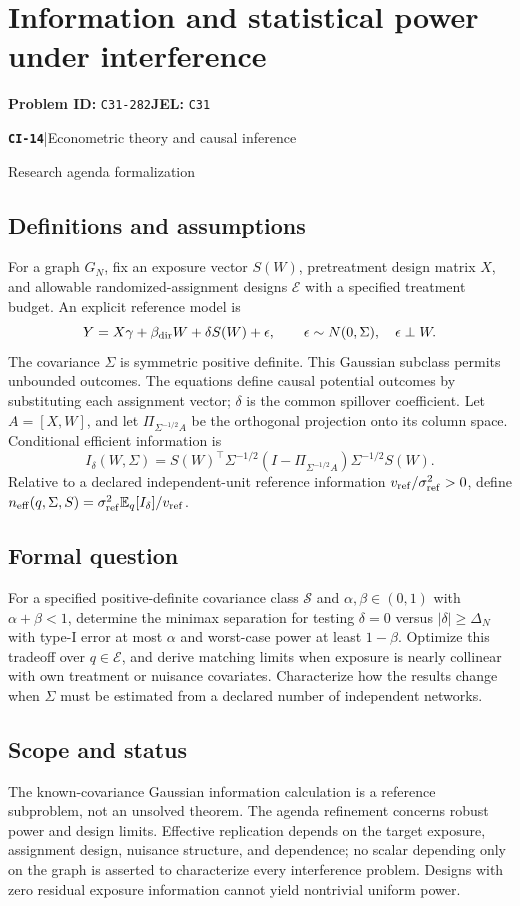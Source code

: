 \documentclass[11pt,a4paper]{article}
\newcommand{\E}{\mathbb E}
\newcommand{\entrymeta}[3]{{\sffamily\small\color{muted}\textbf{\texttt{#1}}\quad|\quad #2\par #3\par}}
\begin{document}
\section*{Information and statistical power under interference}
\textbf{Problem ID:} \texttt{C31-282}\quad \textbf{JEL:} \texttt{C31}\par
\label{problem:OP-0493}
\label{beyond:CI-14}
\entrymeta{CI-14}{Econometric theory and causal inference}{Research agenda formalization}
\subsection*{Definitions and assumptions}
For a graph $G_N$, fix an exposure vector $S(W)$, pretreatment design matrix $X$, and allowable randomized-assignment designs $\mathcal E$ with a specified treatment budget. An explicit reference model is
\[
Y=X\gamma+\beta_{\rm dir}W+\delta S(W)+\epsilon,\qquad
\epsilon\sim N(0,\Sigma),\quad \epsilon\perp W.
\]
The covariance $\Sigma$ is symmetric positive definite. This Gaussian subclass permits unbounded outcomes. The equations define causal potential outcomes by substituting each assignment vector; $\delta$ is the common spillover coefficient. Let $A=[X,W]$, and let $\Pi_{\Sigma^{-1/2}A}$ be the orthogonal projection onto its column space. Conditional efficient information is
\[
I_\delta(W,\Sigma)=
S(W)^\top\Sigma^{-1/2}
(I-\Pi_{\Sigma^{-1/2}A})\Sigma^{-1/2}S(W).
\]
Relative to a declared independent-unit reference information $v_{\rm ref}/\sigma_{\rm ref}^2>0$, define
$n_{\rm eff}(q,\Sigma,S)=\sigma_{\rm ref}^2\E_q[I_\delta]/v_{\rm ref}$.
\subsection*{Formal question}
For a specified positive-definite covariance class $\mathcal S$ and $\alpha,\beta\in(0,1)$ with $\alpha+\beta<1$, determine the minimax separation for testing $\delta=0$ versus $|\delta|\geq\Delta_N$ with type-I error at most $\alpha$ and worst-case power at least $1-\beta$. Optimize this tradeoff over $q\in\mathcal E$, and derive matching limits when exposure is nearly collinear with own treatment or nuisance covariates. Characterize how the results change when $\Sigma$ must be estimated from a declared number of independent networks.
\subsection*{Scope and status}
The known-covariance Gaussian information calculation is a reference subproblem, not an unsolved theorem. The agenda refinement concerns robust power and design limits. Effective replication depends on the target exposure, assignment design, nuisance structure, and dependence; no scalar depending only on the graph is asserted to characterize every interference problem. Designs with zero residual exposure information cannot yield nontrivial uniform power.
\end{document}
